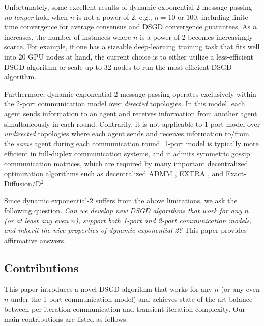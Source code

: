 \documentclass{article}
\theoremstyle{plain}
\theoremstyle{definition}
\begin{document}
Unfortunately, some excellent results of dynamic exponential-2 message passing \emph{no longer} hold when $n$ is not a power of 2, e.g., $n=10$ or $100$, including finite-time convergence for average consensus and DSGD convergence guarantees. As $n$ increases, the {number of instances where $n$ is a power of 2 becomes} increasingly scarce. {For example, if} one has a sizeable deep-learning training task that fits well into 20 GPU nodes at hand, the current choice is to either {utilize} a less-efficient DSGD algorithm or {scale} up to 32 nodes to run the most efficient DSGD algorithm. 

{Furthermore, dynamic exponential-2 message passing operates exclusively within the 2-port communication model over \emph{directed} topologies. In this model, each agent sends information to an agent and receives information from another agent simultaneously in each round.} {Contrarily, it is not applicable} to 1-port model over \emph{undirected} topologies where each agent sends and receives information to/from the {\em same} agent during each communication round. 1-port model is typically more efficient in full-duplex communication systems, and it admits symmetric gossip communication matrices, which are required by many important decentralized optimization algorithms such as decentralized ADMM \cite{shi2014linear}, EXTRA \cite{shi2015extra}, and Exact-Diffusion/D$^2$ \cite{yuan2017exact1,li2017decentralized,tang2018d}.

Since dynamic exponential-2 suffers from the above limitations, we ask the following question. {\em Can we develop new DSGD algorithms that work for any $n$ (or at least any even $n$), support both 1-port and 2-port communication models, and inherit the nice properties of dynamic exponential-2?} This paper provides affirmative answers.



\subsection{Contributions}


This paper introduces a novel DSGD algorithm that works for any $n$ (or any even $n$ under the 1-port communication model) and achieves state-of-the-art balance between per-iteration communication and transient iteration complexity. Our main contributions are listed as follows.
\end{document}
